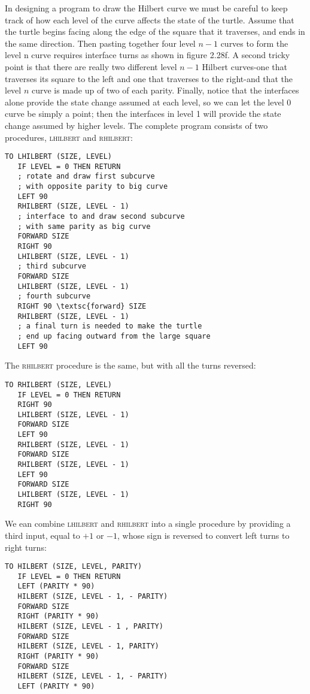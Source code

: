 \documentclass{book}
\begin{document}
In designing a program to draw the Hilbert curve we must be careful
to keep track of how each level of the curve affects the state of the turtle.
Assume that the turtle begins facing along the edge of the square that
it traverses, and ends in the same direction. Then pasting together four
level $n - 1$ curves to form the level n curve requires interface turns as
shown in figure 2.28f. A second tricky point is that there are really two
different level $n - 1$ Hilbert curves-one that traverses its square to the
left and one that traverses to the right-and that the level $n$ curve is
made up of two of each parity. Finally, notice that the interfaces alone
provide the state change assumed at each level, so we can let the level
0 curve be simply a point; then the interfaces in level 1 will provide the
state change assumed by higher levels. The complete program consists
of two procedures, \textsc{lhilbert} and \textsc{rhilbert}:

\begin{verbatim}
TO LHILBERT (SIZE, LEVEL)
   IF LEVEL = 0 THEN RETURN
   ; rotate and draw first subcurve
   ; with opposite parity to big curve
   LEFT 90
   RHILBERT (SIZE, LEVEL - 1)
   ; interface to and draw second subcurve
   ; with same parity as big curve
   FORWARD SIZE
   RIGHT 90
   LHILBERT (SIZE, LEVEL - 1)
   ; third subcurve
   FORWARD SIZE
   LHILBERT (SIZE, LEVEL - 1)
   ; fourth subcurve
   RIGHT 90 \textsc{forward} SIZE
   RHILBERT (SIZE, LEVEL - 1)
   ; a final turn is needed to make the turtle
   ; end up facing outward from the large square
   LEFT 90
\end{verbatim}
The \textsc{rhilbert} procedure is the same, but with all the turns reversed:

\begin{verbatim}
TO RHILBERT (SIZE, LEVEL)
   IF LEVEL = 0 THEN RETURN
   RIGHT 90
   LHILBERT (SIZE, LEVEL - 1)
   FORWARD SIZE
   LEFT 90
   RHILBERT (SIZE, LEVEL - 1)
   FORWARD SIZE
   RHILBERT (SIZE, LEVEL - 1)
   LEFT 90
   FORWARD SIZE
   LHILBERT (SIZE, LEVEL - 1)
   RIGHT 90
\end{verbatim}
We ean combine \textsc{lhilbert} and \textsc{rhilbert} into a single procedure by
providing a third input, equal to $+1$ or $-1$, whose sign is reversed to
convert left turns to right turns:

\begin{verbatim}
TO HILBERT (SIZE, LEVEL, PARITY)
   IF LEVEL = 0 THEN RETURN
   LEFT (PARITY * 90)
   HILBERT (SIZE, LEVEL - 1, - PARITY)
   FORWARD SIZE
   RIGHT (PARITY * 90)
   HILBERT (SIZE, LEVEL - 1 , PARITY)
   FORWARD SIZE
   HILBERT (SIZE, LEVEL - 1, PARITY)
   RIGHT (PARITY * 90)
   FORWARD SIZE
   HILBERT (SIZE, LEVEL - 1, - PARITY)
   LEFT (PARITY * 90)
\end{verbatim}
\end{document}

